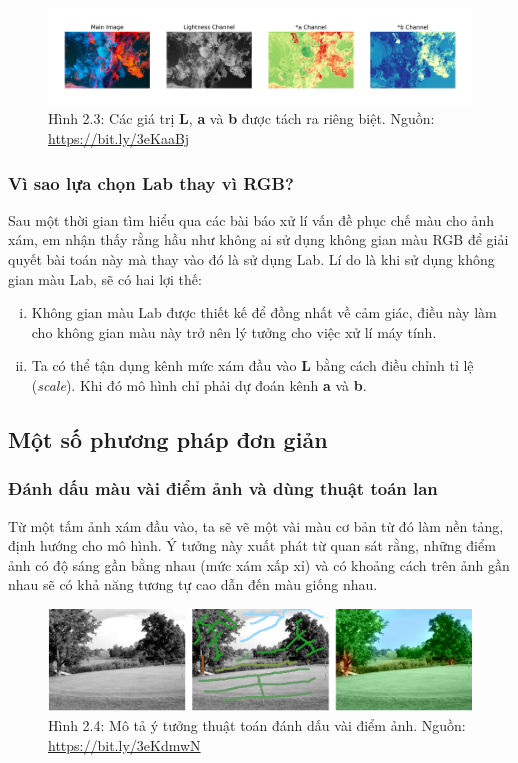 \documentclass[a4paper]{article}
\begin{document}
\begin{figure}[h!]
\centering
\includegraphics[width=16.1cm]{images/2_3.jpeg}
\caption{Hình 2.3: Các giá trị \textbf{L}, \textbf{a} và \textbf{b} được tách ra riêng biệt. Nguồn: \href{https://bit.ly/3eKaaBj}{https://bit.ly/3eKaaBj}}
\end{figure}

\subsubsection{Vì sao lựa chọn Lab thay vì RGB?}
Sau một thời gian tìm hiểu qua các bài báo xử lí vấn đề phục chế màu cho ảnh xám, em nhận thấy rằng hầu như không ai sử dụng không gian màu RGB để giải quyết bài toán này mà thay vào đó là sử dụng Lab. Lí do là khi sử dụng không gian màu Lab, sẽ có hai lợi thế:
\begin{enumerate}[i)]
    \item Không gian màu Lab được thiết kế để đồng nhất về cảm giác, điều này làm cho không gian màu này trở nên lý tưởng cho việc xử lí máy tính.
    
    \item Ta có thể tận dụng kênh mức xám đầu vào \textbf{L} bằng cách điều chỉnh tỉ lệ (\textit{scale}). Khi đó mô hình chỉ phải dự đoán kênh \textbf{a} và \textbf{b}.
\end{enumerate}

\subsection{Một số phương pháp đơn giản}

\subsubsection{Đánh dấu màu vài điểm ảnh và dùng thuật toán lan}
Từ một tấm ảnh xám đầu vào, ta sẽ vẽ một vài màu cơ bản từ đó làm nền tảng, định hướng cho mô hình. Ý tưởng này xuất phát từ quan sát rằng, những điểm ảnh có độ sáng gần bằng nhau (mức xám xấp xỉ) và có khoảng cách trên ảnh gần nhau sẽ có khả năng tương tự cao dẫn đến màu giống nhau.

\begin{figure}[h!]
\centering
\includegraphics[width=15cm]{images/2_4.png}
\caption{Hình 2.4: Mô tả ý tưởng thuật toán đánh dấu vài điểm ảnh. Nguồn: \href{https://bit.ly/3eKdmwN}{https://bit.ly/3eKdmwN}}
\end{figure}
\end{document}
